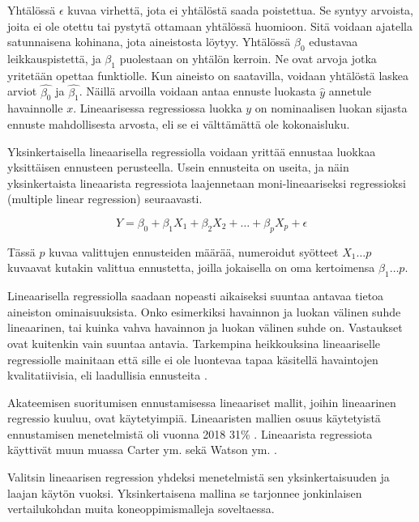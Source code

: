 \documentclass[finnish,twoside,openright]{HYgraduMLDS}
\begin{document}
Yhtälössä $\epsilon$ kuvaa virhettä, jota ei yhtälöstä saada poistettua. Se syntyy arvoista, joita ei ole otettu tai pystytä ottamaan yhtälössä huomioon. Sitä voidaan ajatella satunnaisena kohinana, jota aineistosta löytyy. Yhtälössä $\beta_0$ edustavaa leikkauspistettä, ja $\beta_1$ puolestaan on yhtälön kerroin. Ne ovat arvoja jotka yritetään opettaa funktiolle. Kun aineisto on saatavilla, voidaan yhtälöstä laskea arviot $\hat{\beta_0}$ ja $\hat{\beta_1}$. Näillä arvoilla voidaan antaa ennuste luokasta $\hat{y}$ annetule havainnolle $x$. Lineaarisessa regressiossa luokka $y$ on nominaalisen luokan sijasta ennuste mahdollisesta arvosta, eli se ei välttämättä ole kokonaisluku.

Yksinkertaisella lineaarisella regressiolla voidaan yrittää ennustaa luokkaa yksittäisen ennusteen perusteella. Usein ennusteita on useita, ja näin yksinkertaista lineaarista regressiota laajennetaan moni-lineaariseksi regressioksi (multiple linear regression) seuraavasti.

\begin{equation} \label{eq:2}
    Y = \beta_0 + \beta_1 X_1 + \beta_2 X_2 + \dots + \beta_p X_p + \epsilon
\end{equation}

Tässä $p$ kuvaa valittujen ennusteiden määrää, numeroidut syötteet $X_1\dots p$ kuvaavat kutakin valittua ennustetta, joilla jokaisella on oma kertoimensa $\beta_1\dots p$.

Lineaarisella regressiolla saadaan nopeasti aikaiseksi suuntaa antavaa tietoa aineiston ominaisuuksista. Onko esimerkiksi havainnon ja luokan välinen suhde lineaarinen, tai kuinka vahva havainnon ja luokan välinen suhde on. Vastaukset ovat kuitenkin vain suuntaa antavia. Tarkempina heikkouksina lineaariselle regressiolle mainitaan että sille ei ole luontevaa tapaa käsitellä havaintojen kvalitatiivisia, eli laadullisia ennusteita \cite{james2013ISLR}. 

Akateemisen suoritumisen ennustamisessa lineaariset mallit, joihin lineaarinen regressio kuuluu, ovat käytetyimpiä. Lineaaristen mallien osuus käytetyistä ennustamisen menetelmistä oli vuonna 2018 31\% \cite{hellas2018predicting}. Lineaarista regressiota käyttivät muun muassa Carter ym. \cite{carter2015normalized} sekä Watson ym. \cite{watson2013predicting}.

Valitsin lineaarisen regression yhdeksi menetelmistä sen yksinkertaisuuden ja laajan käytön vuoksi. Yksinkertaisena mallina se tarjonnee jonkinlaisen vertailukohdan muita koneoppimismalleja soveltaessa.
\end{document}
